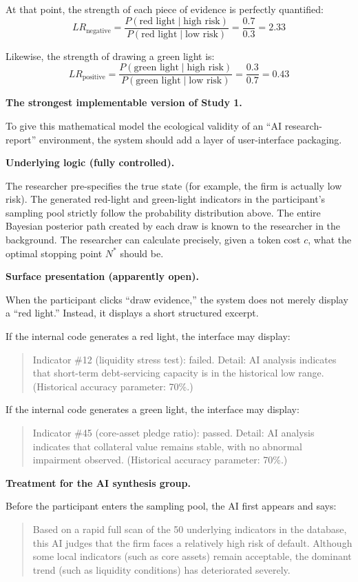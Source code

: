 At that point, the strength of each piece of evidence is perfectly quantified:
\[
LR_{\text{negative}} =
\frac{P(\text{red light} \mid \text{high risk})}{P(\text{red light} \mid \text{low risk})}
= \frac{0.7}{0.3}
= 2.33
\]

Likewise, the strength of drawing a green light is:
\[
LR_{\text{positive}} =
\frac{P(\text{green light} \mid \text{high risk})}{P(\text{green light} \mid \text{low risk})}
= \frac{0.3}{0.7}
= 0.43
\]

\textbf{The strongest implementable version of Study 1.}

To give this mathematical model the ecological validity of an ``AI research-report'' environment, the system should add a layer of user-interface packaging.

\textbf{Underlying logic (fully controlled).}

The researcher pre-specifies the true state (for example, the firm is actually low risk). The generated red-light and green-light indicators in the participant's sampling pool strictly follow the probability distribution above. The entire Bayesian posterior path created by each draw is known to the researcher in the background. The researcher can calculate precisely, given a token cost \(c\), what the optimal stopping point \(N^{*}\) should be.

\textbf{Surface presentation (apparently open).}

When the participant clicks ``draw evidence,'' the system does not merely display a ``red light.'' Instead, it displays a short structured excerpt.

If the internal code generates a red light, the interface may display:
\begin{quote}
Indicator \#12 (liquidity stress test): failed. Detail: AI analysis indicates that short-term debt-servicing capacity is in the historical low range. (Historical accuracy parameter: 70\%.)
\end{quote}

If the internal code generates a green light, the interface may display:
\begin{quote}
Indicator \#45 (core-asset pledge ratio): passed. Detail: AI analysis indicates that collateral value remains stable, with no abnormal impairment observed. (Historical accuracy parameter: 70\%.)
\end{quote}

\textbf{Treatment for the AI synthesis group.}

Before the participant enters the sampling pool, the AI first appears and says:
\begin{quote}
Based on a rapid full scan of the 50 underlying indicators in the database, this AI judges that the firm faces a relatively high risk of default. Although some local indicators (such as core assets) remain acceptable, the dominant trend (such as liquidity conditions) has deteriorated severely.
\end{quote}

